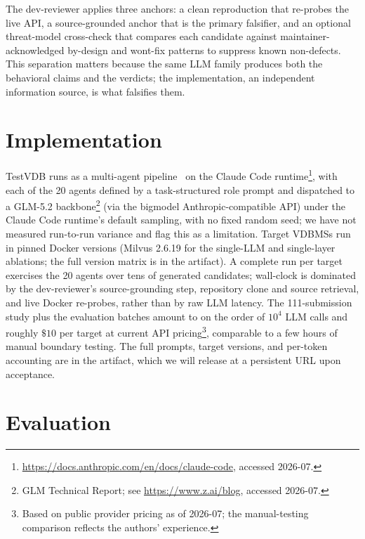 \documentclass[sigconf]{acmart}
\begin{document}
The dev-reviewer applies three anchors: a clean reproduction that re-probes the live API, a source-grounded anchor that is the primary falsifier, and an optional threat-model cross-check that compares each candidate against maintainer-acknowledged by-design and wont-fix patterns to suppress known non-defects. This separation matters because the same LLM family produces both the behavioral claims and the verdicts; the implementation, an independent information source, is what falsifies them.

\section{Implementation} \label{sec:impl}

TestVDB runs as a multi-agent pipeline~\cite{he2025lma} on the Claude Code runtime\footnote{\url{https://docs.anthropic.com/en/docs/claude-code}, accessed 2026-07.}, with each of the 20 agents defined by a task-structured role prompt and dispatched to a GLM-5.2 backbone\footnote{GLM Technical Report; see \url{https://www.z.ai/blog}, accessed 2026-07.} (via the bigmodel Anthropic-compatible API) under the Claude Code runtime's default sampling, with no fixed random seed; we have not measured run-to-run variance and flag this as a limitation. Target VDBMSs run in pinned Docker versions (Milvus 2.6.19 for the single-LLM and single-layer ablations; the full version matrix is in the artifact). A complete run per target exercises the 20 agents over tens of generated candidates; wall-clock is dominated by the dev-reviewer's source-grounding step, repository clone and source retrieval, and live Docker re-probes, rather than by raw LLM latency. The 111-submission study plus the evaluation batches amount to on the order of $10^4$ LLM calls and roughly $\$10$ per target at current API pricing\footnote{Based on public provider pricing as of 2026-07; the manual-testing comparison reflects the authors' experience.}, comparable to a few hours of manual boundary testing. The full prompts, target versions, and per-token accounting are in the artifact, which we will release at a persistent URL upon acceptance.

\section{Evaluation} \label{sec:eval}
\end{document}
